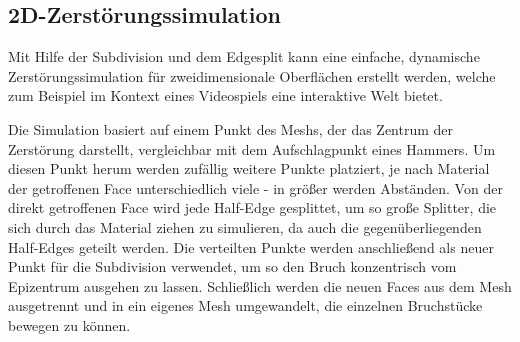 \subsection {2D-Zerst\"orungssimulation}
Mit Hilfe der Subdivision und dem Edgesplit kann eine einfache, dynamische Zer\-st\"orungs\-simulation f\"ur zweidimensionale Oberfl\"achen erstellt werden, welche zum Beispiel im Kontext eines Videospiels eine interaktive Welt bietet. 

Die Simulation basiert auf einem Punkt des Meshs, der das Zentrum der Zerst\"orung darstellt, vergleichbar mit dem Aufschlagpunkt eines Hammers. Um diesen Punkt herum werden zuf\"allig weitere Punkte platziert, je nach Material der getroffenen Face unterschiedlich viele - in gr\"o{\ss}er werden Abst\"anden. Von der direkt getroffenen Face wird jede Half-Edge gesplittet, um so gro{\ss}e Splitter, die sich durch das Material ziehen zu simulieren, da auch die gegen\"uberliegenden Half-Edges geteilt werden. Die verteilten Punkte werden anschlie{\ss}end als neuer Punkt f\"ur die Subdivision verwendet, um so den Bruch konzentrisch vom Epizentrum ausgehen zu lassen. Schlie{\ss}lich werden die neuen Faces aus dem Mesh ausgetrennt und in ein eigenes Mesh umgewandelt, die einzelnen Bruchst\"ucke bewegen zu k\"onnen.

